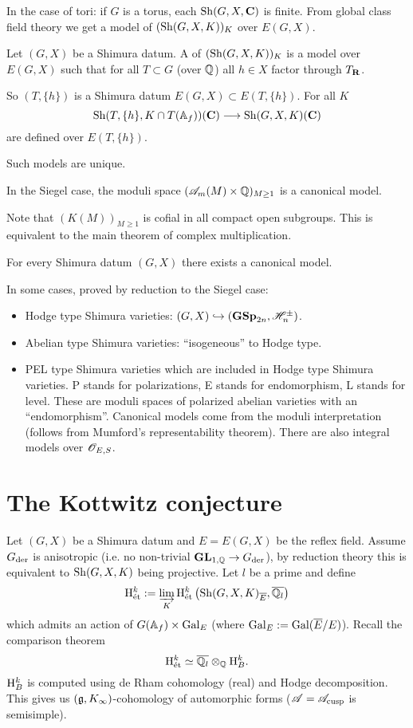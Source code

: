 In the case of tori: if $G$ is a torus, each $\operatorname{Sh}(G,X,\mathbf{C})$ is finite. From global class field theory we get a model of $(\operatorname{Sh}(G,X,K))_K$ over $E(G,X)$.

\begin{definition}
	Let $(G,X)$ be a Shimura datum. A  of $(\operatorname{Sh}(G,X,K))_K$ is a model over $E(G,X)$ such that for all  $T\subset G$ (over $\mathbb Q$) all $h\in X$ factor through $T_\mathbf{R}$.
\end{definition}
So $(T,\{h\} )$ is a Shimura datum $E(G,X)\subset E(T,\{h\} )$. For all $K$ 
\[
\Sh(T,\{h\} , K\cap T(\A_f))(\C) \to \Sh(G,X,K)(\C)
\] 
are defined over $E(T,\{h\} )$.

\begin{proposition}
	Such models are unique.
\end{proposition}
\begin{theorem}
	In the Siegel case, the moduli space $(\mathscr{A}_m(M)\times \mathbb Q)_{M\ge 1}$ is a canonical model.
\end{theorem}
Note that $(K(M))_{M\ge 1}$ is cofial in all compact open subgroups. This is equivalent to the main theorem of complex multiplication.

\begin{theorem}
	For every Shimura datum $(G,X)$ there exists a canonical model.
\end{theorem}
In some cases, proved by reduction to the Siegel case:
\begin{itemize}
	\item Hodge type Shimura varieties: $(G,X) \hookrightarrow (\mathbf{GSp}_{2n}, \mathscr H_n^{\pm})$.
	\item Abelian type Shimura varieties: ``isogeneous'' to Hodge type.
	\item PEL type Shimura varieties which are included in Hodge type Shimura varieties. P stands for polarizations, E stands for endomorphism, L stands for level. These are moduli spaces of polarized abelian varieties with an ``endomorphism''. Canonical models come from the moduli interpretation (follows from Mumford's representability theorem). There are also integral models over $\mathscr{O}_{E,S}$.
\end{itemize}

\section{The Kottwitz conjecture}
Let $(G,X)$ be a Shimura datum and $E=E(G,X)$ be the reflex field. Assume $G_{\mathrm{der}}$ is anisotropic (i.e. no non-trivial $\GL_{1,\Q}\to G\der$), by reduction theory this is equivalent to $\operatorname{Sh}(G,X,K)$ being projective. Let $l$ be a prime and define
\[
\mathrm{H}^{k}_{\text{\'et}} := \varinjlim_K \mathrm{H}^{k}_{\text{\'et}}\left( \operatorname{Sh}(G,X,K)_{\overline{E}}, \overline{\mathbb Q_l} \right) 
\] 
which admits an action of $G(\mathbb{A}_f)\times \operatorname{Gal}_E$ (where $\operatorname{Gal}_E:= \operatorname{Gal}(\overline{E} /E)$). Recall the comparison theorem
\[
\mathrm{H}^{k}_{\text{\'et}} \simeq \overline{\mathbb Q_l} \otimes_\mathbb Q \mathrm{H}_B^{k}.
\] 
$\mathrm{H}_B^{k}$ is computed using de Rham cohomology (real) and Hodge decomposition. This gives us $(\mathfrak{g},K_{\infty})$-cohomology of automorphic forms ($\mathscr{A}=\mathscr{A}_{\text{cusp}}$ is semisimple).

